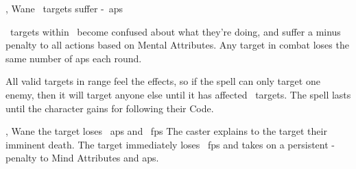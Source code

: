   {\mWater, \mFate}%
  {Wane}%
  {\duplicated}%
  {}%
  {\spellArea\ targets suffer -~\glspl{ap}}%
  {
    \spellArea\ targets within \spellRange\ become confused about what they're doing, and suffer a minus  penalty to all actions based on Mental Attributes.
    Any target in combat loses the same number of \glspl{ap} each round.

    All valid targets in range feel the effects, so if the spell can only target one enemy, then it will target anyone else until it has affected \spellArea\ targets.
    The spell lasts until the character gains  for following their Code.
  }

  {\mWater, \mFate}%
  {Wane}%
  {\divergent}%
  {}%
  {the target loses ~\glspl{ap} and \rollConv~\glspl{fp}}%
  {
    The caster explains to the target their imminent death.
    The target immediately loses \rollConv\ \glspl{fp} and takes on a persistent - penalty to Mind Attributes and \glspl{ap}.
  }
